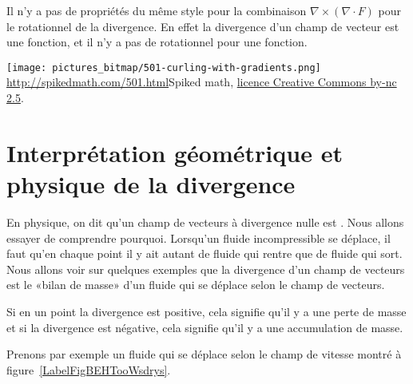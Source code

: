 \begin{remark}
	Il n'y a pas de propriétés du même style pour la combinaison \( \nabla\times(\nabla\cdot F)\) pour le rotationnel de la divergence. En effet la divergence d'un champ de vecteur est une fonction, et il n'y a pas de rotationnel pour une fonction.
\end{remark}

{
	\begin{center}
		\texttt{[image: pictures\_bitmap/501-curling-with-gradients.png]}\\
		\url{http://spikedmath.com/501.html}{Spiked math}, \href{http://creativecommons.org/licenses/by-nc-sa/2.5/ca/}{licence Creative Commons by-nc 2.5}.
	\end{center}
}{}

\section[Interprétation de la divergence]{Interprétation géométrique et physique de la divergence}

En physique, on dit qu'un champ de vecteurs à divergence nulle est . Nous allons essayer de comprendre pourquoi. Lorsqu'un fluide incompressible se déplace, il faut qu'en chaque point il y ait autant de fluide qui rentre que de fluide qui sort. Nous allons voir sur quelques exemples que la divergence d'un champ de vecteurs est le «bilan de masse» d'un fluide qui se déplace selon le champ de vecteurs.

Si en un point la divergence est positive, cela signifie qu'il y a une perte de masse et si la divergence est négative, cela signifie qu'il y a une accumulation de masse.

Prenons par exemple un fluide qui se déplace selon le champ de vitesse montré à figure~\ref{LabelFigBEHTooWsdrys}. %
\newcommand{\CaptionFigBEHTooWsdrys}{Le champ de vecteurs \( F(x,y)=\frac{1}{ x }(1,0)\).}



